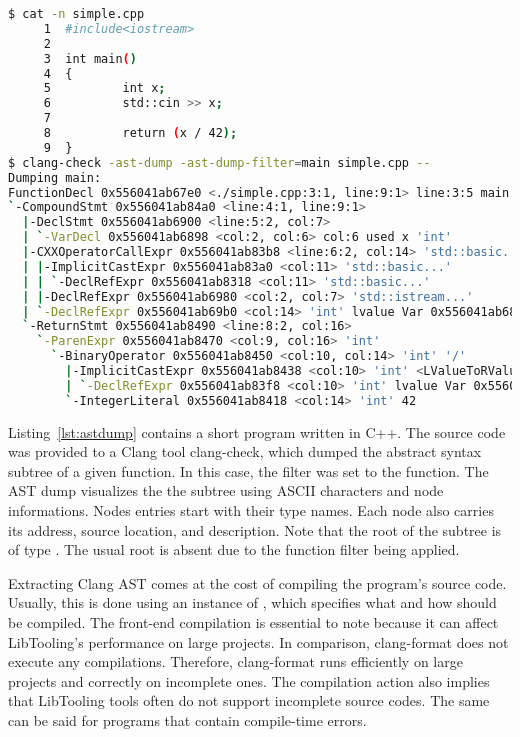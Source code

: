 \begin{lstlisting}[caption=Clang AST Dump, language=bash, 
label={lst:astdump}, basicstyle=\tiny, numbers=none]
$ cat -n simple.cpp
     1  #include<iostream>
     2
     3  int main()
     4  {
     5          int x;
     6          std::cin >> x;
     7
     8          return (x / 42);
     9  } 
$ clang-check -ast-dump -ast-dump-filter=main simple.cpp --
Dumping main:
FunctionDecl 0x556041ab67e0 <./simple.cpp:3:1, line:9:1> line:3:5 main 'int ()'
`-CompoundStmt 0x556041ab84a0 <line:4:1, line:9:1>
  |-DeclStmt 0x556041ab6900 <line:5:2, col:7>
  | `-VarDecl 0x556041ab6898 <col:2, col:6> col:6 used x 'int'
  |-CXXOperatorCallExpr 0x556041ab83b8 <line:6:2, col:14> 'std::basic...'
  | |-ImplicitCastExpr 0x556041ab83a0 <col:11> 'std::basic...'
  | | `-DeclRefExpr 0x556041ab8318 <col:11> 'std::basic...'
  | |-DeclRefExpr 0x556041ab6980 <col:2, col:7> 'std::istream...'
  | `-DeclRefExpr 0x556041ab69b0 <col:14> 'int' lvalue Var 0x556041ab6898 'x' 'int'
  `-ReturnStmt 0x556041ab8490 <line:8:2, col:16>
    `-ParenExpr 0x556041ab8470 <col:9, col:16> 'int'
      `-BinaryOperator 0x556041ab8450 <col:10, col:14> 'int' '/'
        |-ImplicitCastExpr 0x556041ab8438 <col:10> 'int' <LValueToRValue>
        | `-DeclRefExpr 0x556041ab83f8 <col:10> 'int' lvalue Var 0x556041ab6898 'x' 'int'
        `-IntegerLiteral 0x556041ab8418 <col:14> 'int' 42
\end{lstlisting}

Listing~\ref{lst:astdump} contains a short program written in C++.
The source code was provided to a Clang tool clang-check, which
dumped the abstract syntax subtree of a given function.
In this case, the filter was set to the  function.
The AST dump visualizes the the subtree using ASCII characters
and node informations.
Nodes entries start with their type names. 
Each node also carries its address, source location, and description.
Note that the root of the subtree is of type .
The usual root  is absent due to the function
filter being applied.

Extracting Clang AST comes at the cost of compiling the program's
source code. 
Usually, this is done using an instance of , 
which specifies what and how should be compiled. 
The front-end compilation is essential to note because it can affect 
LibTooling's performance on large projects. 
In comparison, clang-format does not execute any compilations. 
Therefore, clang-format runs efficiently on large projects 
and correctly on incomplete ones. 
The compilation action also implies that LibTooling tools often 
do not support incomplete source codes. 
The same can be said for programs that contain compile-time errors.

